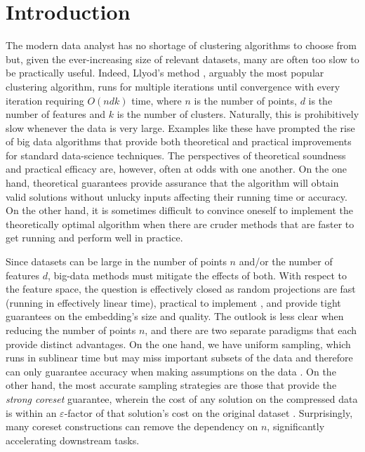 \section{Introduction}

The modern data analyst has no shortage of clustering algorithms to choose from but, given the ever-increasing size of relevant datasets, many are often too
slow to be practically useful.  Indeed, Llyod's method \cite{Lloyd82}, arguably the most popular clustering algorithm, runs for multiple iterations until
convergence with every iteration requiring $O(ndk)$ time, where $n$ is the number of points, $d$ is the number of features and $k$ is the number of clusters.
Naturally, this is prohibitively slow whenever the data is very large. Examples like these have prompted the rise of big data algorithms that provide both
theoretical and practical improvements for standard data-science techniques. The perspectives of theoretical soundness and practical efficacy are, however,
often at odds with one another. On the one hand, theoretical guarantees provide assurance that the algorithm will obtain valid solutions without unlucky inputs
affecting their running time or accuracy. On the other hand, it is sometimes difficult to convince oneself to implement the theoretically optimal algorithm when
there are cruder methods that are faster to get running and perform well in practice.

Since datasets can be large in the number of points $n$ and/or the number of features $d$, big-data methods must mitigate the effects of both.  With respect to
the feature space, the question is effectively closed as random projections are fast (running in effectively linear time), practical to implement
\cite{MakarychevMR19}, and provide tight guarantees on the embedding's size and quality. The outlook is less clear when reducing the number of points
$n$, and there are two separate paradigms that each provide distinct advantages.  On the one hand, we have uniform sampling, which runs in sublinear time but
may miss important subsets of the data and therefore can only guarantee accuracy when making assumptions on the data \cite{HJJ23}.  On the other hand, the
most accurate sampling strategies are those that provide the \emph{strong coreset} guarantee, wherein the cost of any solution on the compressed data is within
an $\varepsilon$-factor of that solution's cost on the original dataset \cite{CSS21}.  Surprisingly, many coreset constructions can remove the dependency on
$n$, significantly accelerating downstream tasks.


